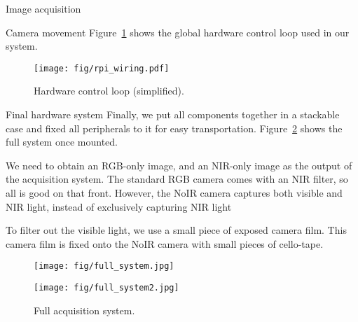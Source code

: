 \documentclass[11pt]{article}
\begin{document}
\begin{section}{Image acquisition}
\begin{subsubsection}{Camera movement}
        Figure~\ref{fig:servomotor_control_loop} shows the global hardware control loop used in our system.

        \begin{figure}[!h]
            \begin{center}
                \texttt{[image: fig/rpi\_wiring.pdf]}
                \caption{Hardware control loop (simplified).}
                \label{fig:servomotor_control_loop}
            \end{center}
        \end{figure}
    \end{subsubsection}

    \begin{subsubsection}{Final hardware system}
        Finally, we put all components together in a stackable case and fixed all peripherals to it for easy transportation. Figure~\ref{fig:full_system} shows the full system once mounted.

        \medskip

        We need to obtain an RGB-only image, and an NIR-only image as the output of the acquisition system. The standard RGB camera comes with an NIR filter, so all is good on that front. However, the NoIR camera captures both visible and NIR light, instead of exclusively capturing NIR light

        \medskip

        To filter out the visible light, we use a small piece of exposed camera film. This camera film is fixed onto the NoIR camera with small pieces of cello-tape.

        \begin{figure}[!h]
            \centering
            \begin{minipage}[b]{0.45\textwidth}
                \texttt{[image: fig/full\_system.jpg]}
            \end{minipage} \hspace{0.5em} %
            \begin{minipage}[b]{0.45\textwidth}
                \texttt{[image: fig/full\_system2.jpg]}
            \end{minipage}
            \caption{Full acquisition system.}
            \label{fig:full_system}
        \end{figure}

    \end{subsubsection}


\end{section}
\end{document}
